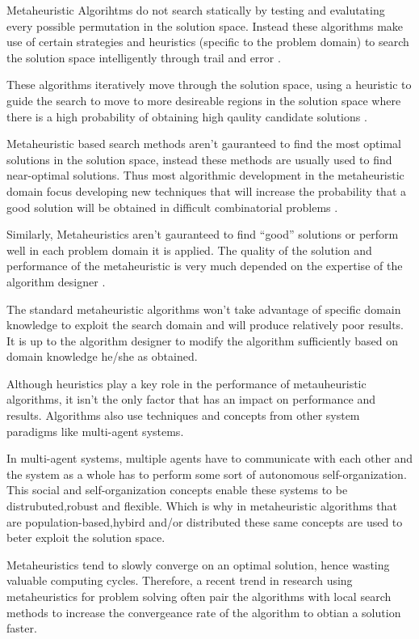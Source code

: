 Metaheuristic Algorihtms do not search statically by testing and evalutating every possible permutation in the solution space. Instead these algorithms make use of certain strategies and heuristics (specific to the problem domain) to search the solution space intelligently through trail and error \cite{MetaAgricultural}. 

These algorithms iteratively move through the solution space, using a heuristic to guide the search to move to more desireable regions in the solution space where there is a high probability of obtaining high qaulity candidate solutions \cite{HeuristicManipulation,SweepMeta}.

Metaheuristic based search methods aren't gauranteed to find the most optimal solutions in the solution space, instead these methods are usually used to find near-optimal solutions. Thus most algorithmic development in the metaheuristic domain focus developing new techniques that will increase the probability that a good solution will be obtained in difficult combinatorial problems \cite{MetaAgricultural}.

Similarly, Metaheuristics aren't gauranteed to find ``good'' solutions or perform well in each problem domain it is applied. The quality of the solution and performance of the metaheuristic is very much depended on the expertise of the algorithm designer \cite{AutoComplexMeta}. 

The standard metaheuristic algorithms won't take advantage of specific domain knowledge to exploit the search domain and will produce relatively poor results. It is up to the algorithm designer to modify the algorithm sufficiently based on domain knowledge he/she as obtained\cite{AutoComplexMeta}.

Although heuristics play a key role in the performance of metauheuristic algorithms, it isn't the only factor that has an impact on performance and results.  Algorithms also use techniques and concepts from other system paradigms like multi-agent systems. 

In multi-agent systems, multiple agents have to communicate with each other and the system as a whole has to perform some sort of autonomous self-organization. This social and self-organization concepts enable these systems to be distrubuted,robust and flexible. Which is why in metaheuristic algorithms that are population-based,hybird and/or distributed these same concepts are used to beter exploit the solution space\cite{Self-AdaptiveMeta}.

Metaheuristics tend to slowly converge on an optimal solution, hence wasting valuable computing cycles. Therefore, a recent trend in research using metaheuristics for problem solving often pair the algorithms with local search methods to increase the convergeance rate of the algorithm to obtian a solution faster\cite{NonlinearGlobalTabu}.

